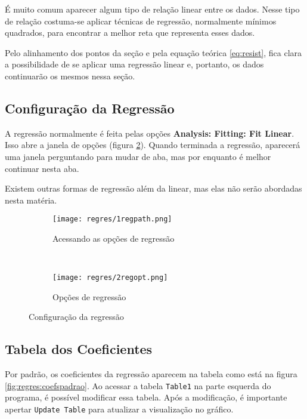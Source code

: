 É muito comum aparecer algum tipo de relação linear entre os dados. Nesse tipo de relação costuma-se aplicar técnicas de regressão, normalmente mínimos quadrados, para encontrar a melhor reta que representa esses dados.

Pelo alinhamento dos pontos da seção  e pela equação teórica \ref{eq:resist}, fica clara a possibilidade de se aplicar uma regressão linear e, portanto, os dados continuarão os mesmos nessa seção.

\subsection{Configuração da Regressão}

    A regressão normalmente é feita pelas opções \textbf{Analysis: Fitting: Fit Linear}. Isso abre a janela de opções (figura \ref{fig:regres:opt}). Quando terminada a regressão, aparecerá uma janela perguntando para mudar de aba, mas por enquanto é melhor continuar nesta aba.

    Existem outras formas de regressão além da linear, mas elas não serão abordadas nesta matéria.

    \begin{figure}[htbp]
        \centering
        \begin{subfigure}{0.60\textwidth}
            \centering
            \texttt{[image: regres/1regpath.png]}

            \caption{Acessando as opções de regressão}
            \label{fig:regres:path}
        \end{subfigure}
        ~
        \begin{subfigure}{0.35\textwidth}
            \centering
            \texttt{[image: regres/2regopt.png]}

            \caption{Opções de regressão}
            \label{fig:regres:opt}
        \end{subfigure}
        \caption{Configuração da regressão}
        \label{fig:regres:config}
    \end{figure}


    \subsection{Tabela dos Coeficientes}

    Por padrão, os coeficientes da regressão aparecem na tabela como está na figura \ref{fig:regres:coefspadrao}. Ao acessar a tabela \texttt{Table1} na parte esquerda do programa, é possível modificar essa tabela. Após a modificação, é importante apertar \texttt{Update Table} para atualizar a visualização no gráfico.

